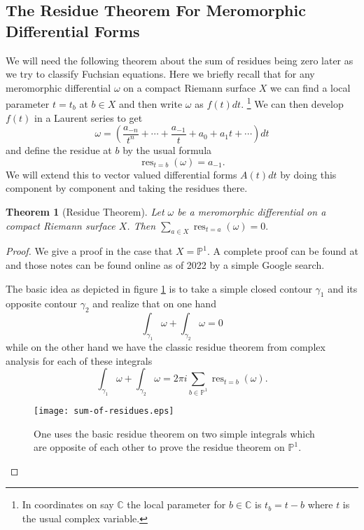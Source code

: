 \documentclass[12pt]{book}
\numberwithin{equation}{section}
\newtheorem{theorem}{Theorem}[subsection]
\theoremstyle{definition}
\theoremstyle{remark}
\newcommand{\CC}{\mathbb{C}}
\newcommand{\PP}{\mathbb{P}}
\newcommand{\res}{\operatorname{res}}
\begin{document}
\subsection{The Residue Theorem For Meromorphic Differential Forms}\label{S:residue-theorem}
We will need the following theorem about the sum of residues being zero later as we try to classify Fuchsian equations.
Here we briefly recall that for any meromorphic differential $\omega$ on a compact Riemann surface $X$ we can find a local parameter $t=t_b$ at $b\in X$ and then write $\omega$ as $f(t)dt$. \footnote{In coordinates on say $\CC$ the local parameter for $b\in  \CC$ is $t_b=t-b$ where $t$ is the usual complex variable. }
We can then develop $f(t)$ in a Laurent series to get 
$$ \omega =  \left(\frac{a_{-n} }{t^n} + \cdots + \frac{a_{-1}}{t} + a_0 + a_1 t + \cdots  \right) dt$$
and define the residue at $b$ by the usual formula 
$$ \res_{t=b}(\omega) = a_{-1}.$$
We will extend this to vector valued differential forms $A(t)dt$  by doing this component by component and taking the residues there.
\begin{theorem}[Residue Theorem]\label{T:residue-theorem}
	Let $\omega$ be a meromorphic differential on a compact Riemann surface $X$. 
	Then $ \sum_{a \in X} \res_{t=a}(\omega) =0.$
\end{theorem}
\begin{proof}
	We give a proof in the case that $X=\PP^1$. 
	A complete proof can be found at \cite[Proposition 6.6]{Schlag2014} and those notes can be found online as of 2022 by a simple Google search.
	
	The basic idea as depicted in figure \ref{F:sum-of-residues} is to take a simple closed contour $\gamma_1$ and its opposite contour $\gamma_2$ and realize that on one hand 
	$$ \int_{\gamma_1}\omega + \int_{\gamma_2} \omega =0 $$
	while on the other hand we have the classic residue theorem from complex analysis for each of these integrals
	$$ \int_{\gamma_1}\omega + \int_{\gamma_2}\omega = 2\pi i \sum_{b \in \PP^1} \res_{t=b}(\omega).$$
	\begin{figure}[h]\label{F:sum-of-residues}
		\begin{center}
			\texttt{[image: sum-of-residues.eps]}
		\end{center}
		\caption{One uses the basic residue theorem on two simple integrals which are opposite of each other to prove the residue theorem on $\PP^1$. }
	\end{figure}
\end{proof}
\end{document}
